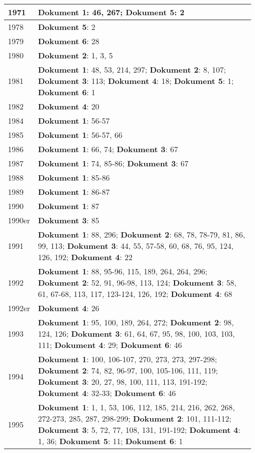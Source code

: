 \documentclass[a5paper]{article}
\begin{document}
\begin{longtable}[l]{|l|p{3in}|}
\hline
1971 & \textbf{Dokument 1}: 46, 267; \textbf{Dokument 5}: 2 \\
\hline
1978 & \textbf{Dokument 5}: 2 \\
\hline
1979 & \textbf{Dokument 6}: 28 \\
\hline
1980 & \textbf{Dokument 2}: 1, 3, 5 \\
\hline
1981 & \textbf{Dokument 1}: 48, 53, 214, 297; \textbf{Dokument 2}: 8, 107; \textbf{Dokument 3}: 113; \textbf{Dokument 4}: 18; \textbf{Dokument 5}: 1; \textbf{Dokument 6}: 1 \\
\hline
1982 & \textbf{Dokument 4}: 20 \\
\hline
1984 & \textbf{Dokument 1}: 56-57 \\
\hline
1985 & \textbf{Dokument 1}: 56-57, 66 \\
\hline
1986 & \textbf{Dokument 1}: 66, 74; \textbf{Dokument 3}: 67 \\
\hline
1987 & \textbf{Dokument 1}: 74, 85-86; \textbf{Dokument 3}: 67 \\
\hline
1988 & \textbf{Dokument 1}: 85-86 \\
\hline
1989 & \textbf{Dokument 1}: 86-87 \\
\hline
1990 & \textbf{Dokument 1}: 87 \\
\hline
1990er & \textbf{Dokument 3}: 85 \\
\hline
1991 & \textbf{Dokument 1}: 88, 296; \textbf{Dokument 2}: 68, 78, 78-79, 81, 86, 99, 113; \textbf{Dokument 3}: 44, 55, 57-58, 60, 68, 76, 95, 124, 126, 192; \textbf{Dokument 4}: 22 \\
\hline
1992 & \textbf{Dokument 1}: 88, 95-96, 115, 189, 264, 264, 296; \textbf{Dokument 2}: 52, 91, 96-98, 113, 124; \textbf{Dokument 3}: 58, 61, 67-68, 113, 117, 123-124, 126, 192; \textbf{Dokument 4}: 68 \\
\hline
1992er & \textbf{Dokument 4}: 26 \\
\hline
1993 & \textbf{Dokument 1}: 95, 100, 189, 264, 272; \textbf{Dokument 2}: 98, 124, 126; \textbf{Dokument 3}: 61, 64, 67, 95, 98, 100, 103, 103, 111; \textbf{Dokument 4}: 29; \textbf{Dokument 6}: 46 \\
\hline
1994 & \textbf{Dokument 1}: 100, 106-107, 270, 273, 273, 297-298; \textbf{Dokument 2}: 74, 82, 96-97, 100, 105-106, 111, 119; \textbf{Dokument 3}: 20, 27, 98, 100, 111, 113, 191-192; \textbf{Dokument 4}: 32-33; \textbf{Dokument 6}: 46 \\
\hline
1995 & \textbf{Dokument 1}: 1, 1, 53, 106, 112, 185, 214, 216, 262, 268, 272-273, 285, 287, 298-299; \textbf{Dokument 2}: 101, 111-112; \textbf{Dokument 3}: 5, 72, 77, 108, 131, 191-192; \textbf{Dokument 4}: 1, 36; \textbf{Dokument 5}: 11; \textbf{Dokument 6}: 1 \\

\end{longtable}
\end{document}
